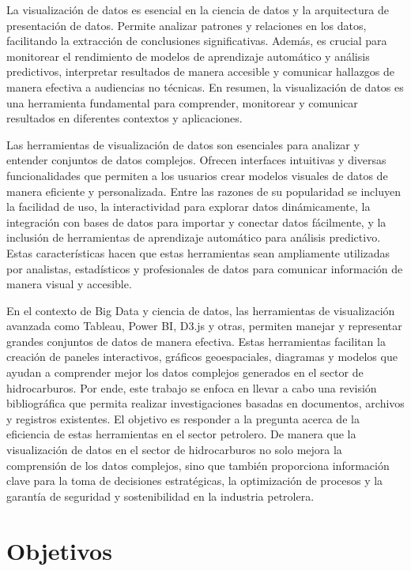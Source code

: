 \documentclass[
  11pt,
  bookmarksnumbered]{article}
\begin{document}
La visualización de datos es esencial en la ciencia de datos y la arquitectura de presentación de datos.
Permite analizar patrones y relaciones en los datos, facilitando la extracción de conclusiones significativas.
Además, es crucial para monitorear el rendimiento de modelos de aprendizaje automático y análisis predictivos, interpretar resultados de manera accesible y comunicar hallazgos de manera efectiva a audiencias no técnicas.
En resumen, la visualización de datos es una herramienta fundamental para comprender, monitorear y comunicar resultados en diferentes contextos y aplicaciones.

Las herramientas de visualización de datos son esenciales para analizar y entender conjuntos de datos complejos.
Ofrecen interfaces intuitivas y diversas funcionalidades que permiten a los usuarios crear modelos visuales de datos de manera eficiente y personalizada.
Entre las razones de su popularidad se incluyen la facilidad de uso, la interactividad para explorar datos dinámicamente, la integración con bases de datos para importar y conectar datos fácilmente, y la inclusión de herramientas de aprendizaje automático para análisis predictivo.
Estas características hacen que estas herramientas sean ampliamente utilizadas por analistas, estadísticos y profesionales de datos para comunicar información de manera visual y accesible.

En el contexto de Big Data y ciencia de datos, las herramientas de visualización avanzada como Tableau, Power BI, D3.js y otras, permiten manejar y representar grandes conjuntos de datos de manera efectiva.
Estas herramientas facilitan la creación de paneles interactivos, gráficos geoespaciales, diagramas y modelos que ayudan a comprender mejor los datos complejos generados en el sector de hidrocarburos.
Por ende, este trabajo se enfoca en llevar a cabo una revisión bibliográfica que permita realizar investigaciones basadas en documentos, archivos y registros existentes.
El objetivo es responder a la pregunta acerca de la eficiencia de estas herramientas en el sector petrolero.
De manera que la visualización de datos en el sector de hidrocarburos no solo mejora la comprensión de los datos complejos, sino que también proporciona información clave para la toma de decisiones estratégicas, la optimización de procesos y la garantía de seguridad y sostenibilidad en la industria petrolera.

\hypertarget{objetivos}{%
\section{\texorpdfstring{\textbf{Objetivos}}{Objetivos}}\label{objetivos}}
\end{document}
